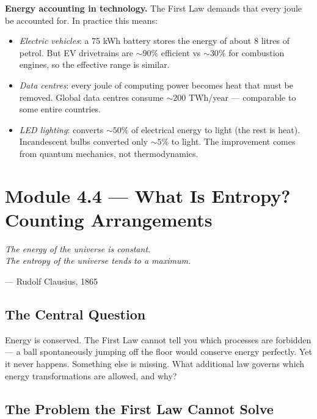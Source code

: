 \documentclass[12pt, a4paper, twoside]{book}
\begin{document}
\begin{realworldbox}
\textbf{Energy accounting in technology.} The First Law demands that every joule be accounted for. In practice this means:
\begin{itemize}[leftmargin=1.5em,itemsep=2pt]
  \item \textit{Electric vehicles}: a 75 kWh battery stores the energy of about 8 litres of petrol. But EV drivetrains are $\sim90\%$ efficient vs $\sim30\%$ for combustion engines, so the effective range is similar.
  \item \textit{Data centres}: every joule of computing power becomes heat that must be removed. Global data centres consume $\sim200$ TWh/year --- comparable to some entire countries.
  \item \textit{LED lighting}: converts $\sim50\%$ of electrical energy to light (the rest is heat). Incandescent bulbs converted only $\sim5\%$ to light. The improvement comes from quantum mechanics, not thermodynamics.
\end{itemize}
\end{realworldbox}

\section{Module 4.4 — What Is Entropy? Counting Arrangements}
\label{sec:entropy}

\epigraph{\itshape
  The energy of the universe is constant.\\
  The entropy of the universe tends to a maximum.
}{--- Rudolf Clausius, 1865}

\subsection{The Central Question}

\begin{puzzlebox}
Energy is conserved. The First Law cannot tell you which processes are forbidden --- a ball spontaneously jumping off the floor would conserve energy perfectly. Yet it never happens. Something else is missing. What additional law governs which energy transformations are allowed, and why?
\end{puzzlebox}

\subsection{The Problem the First Law Cannot Solve}
\end{document}
